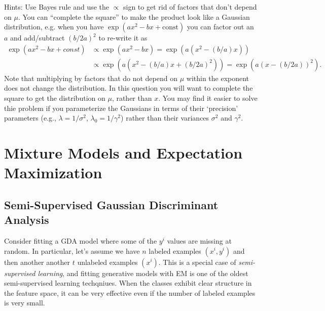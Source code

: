 \documentclass{article}
\begin{document}
Hints: Use Bayes rule and use the $\propto$ sign to get rid of factors that don't depend on $\mu$. You can ``complete the square'' to make the product look like a Gaussian distribution, e.g. when you have $\exp(ax^2 - bx + \text{const})$ you can factor out an $a$ and add/subtract $(b/2a)^2$ to re-write it as
\begin{align*}
\exp\left(ax^2 - bx + const\right) & \propto
\exp\left(ax^2 - bx\right) = \exp\left(a(x^2 - (b/a)x)\right) \\& \propto \exp\left(a(x^2 - (b/a)x + (b/2a)^2)\right) =  \exp\left(a(x - (b/2a))^2\right).
\end{align*}
Note that multiplying by factors that do not depend on $\mu$ within the exponent does not change the distribution. In this question you will want to complete the square to get the distribution on $\mu$, rather than $x$.
You may find it easier to solve thie problem if you parameterize the Gaussians in terms of their `precision' parameters (e.g., $\lambda = 1/\sigma^2$, $\lambda_0 = 1/\gamma^2$) rather than their variances $\sigma^2$ and $\gamma^2$.



\section{Mixture Models and Expectation Maximization}

\subsection{Semi-Supervised Gaussian Discriminant Analysis}

Consider fitting a GDA model where some of the $y^i$ values are missing at random. In particular, let's assume we have $n$ labeled examples $(x^i,y^i)$ and then another another $t$ unlabeled examples $(x^i)$. This is a special case of \emph{semi-supervised learning}, and fitting generative models with EM is one of the oldest semi-supervised learning techqniues. When the classes exhibit clear structure in the feature space, it can be very effective even if the number of labeled examples is very small.
\end{document}
